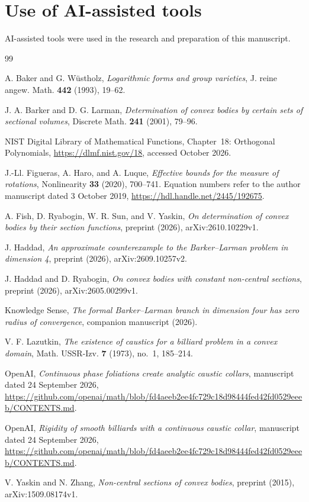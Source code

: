 \documentclass[11pt]{amsart}
\numberwithin{equation}{section}
\theoremstyle{definition}
\theoremstyle{remark}
\begin{document}
\section*{Use of AI-assisted tools}
AI-assisted tools were used in the research and preparation of this manuscript.

\begin{thebibliography}{99}

 A. Baker and G. W\"ustholz, \emph{Logarithmic forms and group varieties}, J. reine angew. Math. \textbf{442} (1993), 19--62.

 J. A. Barker and D. G. Larman, \emph{Determination of convex bodies by certain sets of sectional volumes}, Discrete Math. \textbf{241} (2001), 79--96.

 NIST Digital Library of Mathematical Functions, Chapter~18: Orthogonal Polynomials, \url{https://dlmf.nist.gov/18}, accessed October 2026.

 J.-Ll. Figueras, A. Haro, and A. Luque, \emph{Effective bounds for the measure of rotations}, Nonlinearity \textbf{33} (2020), 700--741. Equation numbers refer to the author manuscript dated 3 October 2019, \url{https://hdl.handle.net/2445/192675}.

 A. Fish, D. Ryabogin, W. R. Sun, and V. Yaskin, \emph{On determination of convex bodies by their section functions}, preprint (2026), arXiv:2610.10229v1.

 J. Haddad, \emph{An approximate counterexample to the Barker--Larman problem in dimension 4}, preprint (2026), arXiv:2609.10257v2.

 J. Haddad and D. Ryabogin, \emph{On convex bodies with constant non-central sections}, preprint (2026), arXiv:2605.00299v1.

 Knowledge Sense, \emph{The formal Barker--Larman branch in dimension four has zero radius of convergence}, companion manuscript (2026).

 V. F. Lazutkin, \emph{The existence of caustics for a billiard problem in a convex domain}, Math. USSR-Izv. \textbf{7} (1973), no.~1, 185--214.

 OpenAI, \emph{Continuous phase foliations create analytic caustic collars}, manuscript dated 24 September 2026, \url{https://github.com/openai/math/blob/fd4aeeb2ee4fc729c18d98444fed42fd0529eeeb/CONTENTS.md}.

 OpenAI, \emph{Rigidity of smooth billiards with a continuous caustic collar}, manuscript dated 24 September 2026, \url{https://github.com/openai/math/blob/fd4aeeb2ee4fc729c18d98444fed42fd0529eeeb/CONTENTS.md}.

 V. Yaskin and N. Zhang, \emph{Non-central sections of convex bodies}, preprint (2015), arXiv:1509.08174v1.

\end{thebibliography}
\end{document}
